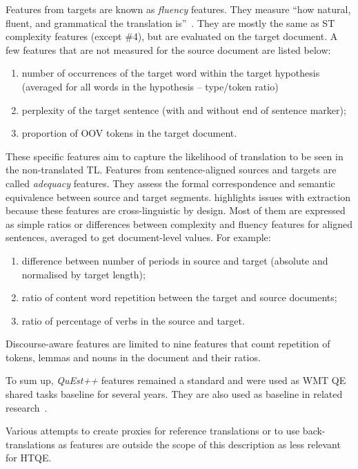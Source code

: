 Features from targets are known as \textit{fluency} features. They measure ``how natural, fluent, and grammatical the translation is''~\cite[p.53]{Specia2018a}. They are mostly the same as ST complexity features (except \#4), but are evaluated on the target document. A few features that are not measured for the source document are listed below:
\begin{enumerate}\compresslist{}
	\item number of occurrences of the target word within the target hypothesis (averaged for all words in the hypothesis -- type/token ratio)
	\item perplexity of the target sentence (with and without end of sentence marker);
	\item proportion of \gls{OOV} tokens in the target document.
\end{enumerate}
These specific features aim to capture the likelihood of translation to be seen in the non-translated TL.
\label{pg:quest_adequacy_feats}
Features from sentence-aligned sources and targets are called \textit{adequacy} features. They assess the formal correspondence and semantic equivalence between source and target segments. \citet{Specia2018a} highlights issues with extraction because these features are cross-linguistic by design. Most of them are expressed as simple ratios or differences between complexity and fluency features for aligned sentences, averaged to get document-level values. For example:

\begin{enumerate}\compresslist{}
	\item difference between number of periods in source and target (absolute and normalised by target length);
	\item ratio of content word repetition between the target and source documents;
	\item ratio of percentage of verbs in the source and target.
\end{enumerate}

Discourse-aware features are limited to nine features that count repetition of tokens, lemmas and nouns in the document and their ratios. 

To sum up, \textit{QuEst++} features remained a standard and were used as WMT QE shared tasks baseline for several years. They are also used as baseline in related research~\cite[e.g.][including for HTQE in~\citet{Yuan2016} and subsequent publications]{Kozlova2016}.

Various attempts to create proxies for reference translations or to use back-translations as features are outside the scope of this description as less relevant for HTQE. 

